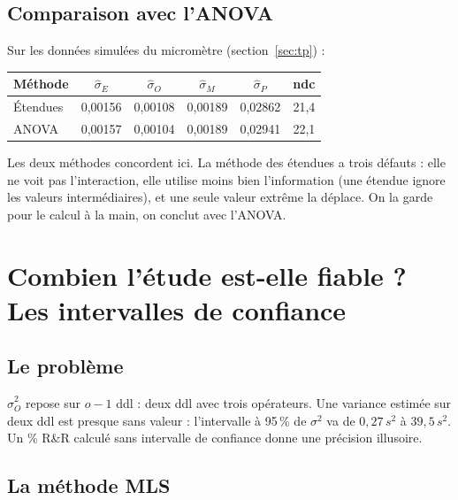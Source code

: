 \documentclass[11pt,a4paper]{article}
\theoremstyle{sj}
\theoremstyle{definition}
\theoremstyle{remark}
\begin{document}
\subsection{Comparaison avec l'ANOVA}

Sur les données simulées du micromètre (section~\ref{sec:tp}) :
\begin{center}
\begin{tabular}{l c c c c c}
\toprule
Méthode & $\hat\sigma_E$ & $\hat\sigma_O$ & $\hat\sigma_M$ & $\hat\sigma_P$ & ndc\\
\midrule
Étendues & 0,00156 & 0,00108 & 0,00189 & 0,02862 & 21,4\\
ANOVA & 0,00157 & 0,00104 & 0,00189 & 0,02941 & 22,1\\
\bottomrule
\end{tabular}
\end{center}
Les deux méthodes concordent ici. La méthode des étendues a trois défauts : elle ne voit pas l'interaction, elle utilise moins bien l'information (une étendue ignore les valeurs intermédiaires), et une seule valeur extrême la déplace. On la garde pour le calcul à la main, on conclut avec l'ANOVA.

\section{Combien l'étude est-elle fiable ? Les intervalles de confiance}\label{sec:ic}

\subsection{Le problème}

$\hat\sigma_O^2$ repose sur $o-1$ ddl : deux ddl avec trois opérateurs. Une variance estimée sur deux ddl est presque sans valeur : l'intervalle à 95\,\% de $\sigma^2$ va de $0{,}27\,s^2$ à $39{,}5\,s^2$. Un \% R\&R calculé sans intervalle de confiance donne une précision illusoire.

\subsection{La méthode MLS}
\end{document}
